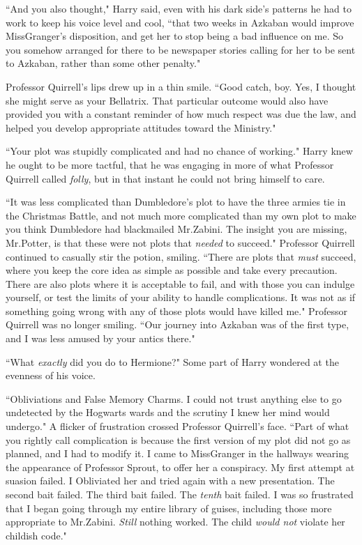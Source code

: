 ``And you also thought," Harry said, even with his dark side's patterns he had to work to keep his voice level and cool, ``that two weeks in Azkaban would improve Miss\?Granger's disposition, and get her to stop being a bad influence on me. So you somehow arranged for there to be newspaper stories calling for her to be sent to Azkaban, rather than some other penalty."

Professor Quirrell's lips drew up in a thin smile. ``Good catch, boy. Yes, I thought she might serve as your Bellatrix. That particular outcome would also have provided you with a constant reminder of how much respect was due the law, and helped you develop appropriate attitudes toward the Ministry."

``Your plot was stupidly complicated and had no chance of working." Harry knew he ought to be more tactful, that he was engaging in more of what Professor Quirrell called \emph{folly}, but in that instant he could not bring himself to care.

``It was less complicated than Dumbledore's plot to have the three armies tie in the Christmas Battle, and not much more complicated than my own plot to make you think Dumbledore had blackmailed Mr.\?Zabini. The insight you are missing, Mr.\?Potter, is that these were not plots that \emph{needed} to succeed." Professor Quirrell continued to casually stir the potion, smiling. ``There are plots that \emph{must} succeed, where you keep the core idea as simple as possible and take every precaution. There are also plots where it is acceptable to fail, and with those you can indulge yourself, or test the limits of your ability to handle complications. It was not as if something going wrong with any of those plots would have killed me." Professor Quirrell was no longer smiling. ``Our journey into Azkaban was of the first type, and I was less amused by your antics there."

``What \emph{exactly} did you do to Hermione?" Some part of Harry wondered at the evenness of his voice.

``Obliviations and False Memory Charms. I could not trust anything else to go undetected by the Hogwarts wards and the scrutiny I knew her mind would undergo." A flicker of frustration crossed Professor Quirrell's face. ``Part of what you rightly call complication is because the first version of my plot did not go as planned, and I had to modify it. I came to Miss\?Granger in the hallways wearing the appearance of Professor Sprout, to offer her a conspiracy. My first attempt at suasion failed. I Obliviated her and tried again with a new presentation. The second bait failed. The third bait failed. The \emph{tenth} bait failed. I was so frustrated that I began going through my entire library of guises, including those more appropriate to Mr.\?Zabini. \emph{Still} nothing worked. The child \emph{would not} violate her childish code."


